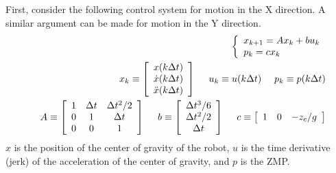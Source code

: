 First, consider the following control system for motion in the X direction. A similar argument can be made for motion in the Y direction.
\begin{eqnarray}
  && \left\{
  \begin{array}{l}
    x_{k+1} = A x_k + b u_k \\
    p_k = c x_k
  \end{array}
  \right. \eqlabel{preview_control}\\
  && x_k \equiv \left[
    \begin{array}{c}
      x(k\Delta t)\\
      \dot x(k\Delta t)\\
      \ddot x(k\Delta t)
    \end{array}
    \right] ~~~~ u_k \equiv u(k\Delta t) ~~~~ p_k \equiv p(k\Delta t)\nonumber\\
  && A \equiv \left[
    \begin{array}{c c c}
      1 & \Delta t & \Delta t^2 / 2\\
      0 & 1 & \Delta t\\
      0 & 0 & 1
    \end{array}
    \right] ~~~~ b \equiv \left[
    \begin{array}{c}
      \Delta t^3 / 6\\
      \Delta t^2 / 2\\
      \Delta t
    \end{array}
    \right] ~~~~ c \equiv \left[
    \begin{array}{c c c}
      1 & 0 & -z_c/g
    \end{array}
    \right]\nonumber
\end{eqnarray}
$x$ is the position of the center of gravity of the robot, $u$ is the time derivative (jerk) of the acceleration of the center of gravity, and $p$ is the ZMP.

